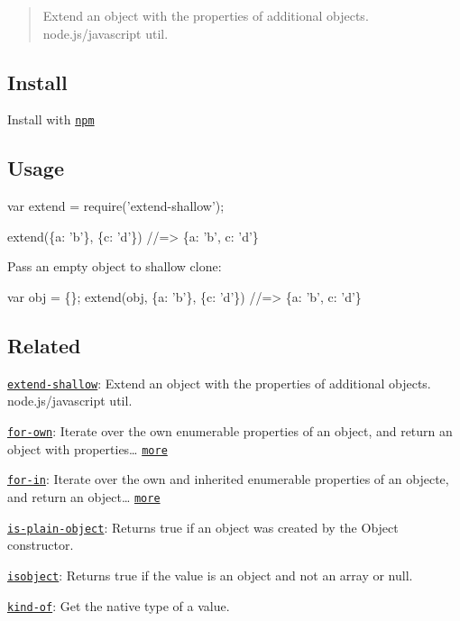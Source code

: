 \begin{quote}
Extend an object with the properties of additional objects. node.\+js/javascript util. \end{quote}


\subsection*{Install}

Install with \href{https://www.npmjs.com/}{\tt npm}




\subsection*{Usage}


\begin{DoxyCode}
var extend = require('extend-shallow');

extend(\{a: 'b'\}, \{c: 'd'\})
//=> \{a: 'b', c: 'd'\}
\end{DoxyCode}


Pass an empty object to shallow clone\+:


\begin{DoxyCode}
var obj = \{\};
extend(obj, \{a: 'b'\}, \{c: 'd'\})
//=> \{a: 'b', c: 'd'\}
\end{DoxyCode}


\subsection*{Related}


\begin{DoxyItemize}
\item \href{https://github.com/jonschlinkert/extend-shallow}{\tt extend-\/shallow}\+: Extend an object with the properties of additional objects. node.\+js/javascript util.
\item \href{https://github.com/jonschlinkert/for-own}{\tt for-\/own}\+: Iterate over the own enumerable properties of an object, and return an object with properties… \href{https://github.com/jonschlinkert/for-own}{\tt more}
\item \href{https://github.com/jonschlinkert/for-in}{\tt for-\/in}\+: Iterate over the own and inherited enumerable properties of an objecte, and return an object… \href{https://github.com/jonschlinkert/for-in}{\tt more}
\item \href{https://github.com/jonschlinkert/is-plain-object}{\tt is-\/plain-\/object}\+: Returns true if an object was created by the {\ttfamily Object} constructor.
\item \href{https://github.com/jonschlinkert/isobject}{\tt isobject}\+: Returns true if the value is an object and not an array or null.
\item \href{https://github.com/jonschlinkert/kind-of}{\tt kind-\/of}\+: Get the native type of a value.
\end{DoxyItemize}

